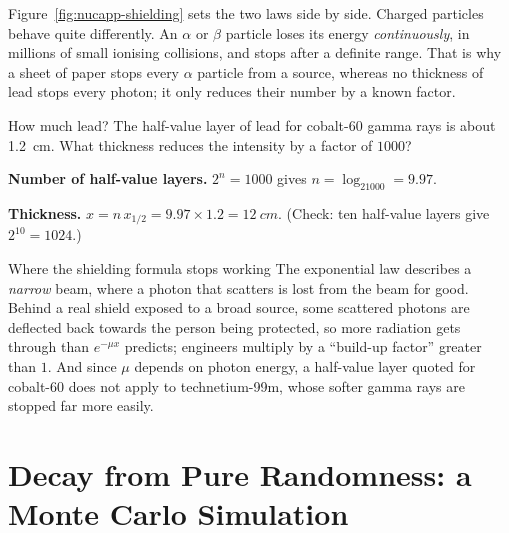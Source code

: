 Figure~\ref{fig:nucapp-shielding} sets the two laws side by side. Charged particles behave quite
differently. An $\alpha$ or $\beta$ particle loses its energy \emph{continuously}, in millions of small
ionising collisions, and stops after a definite range. That is why a sheet of paper stops every $\alpha$
particle from a source, whereas no thickness of lead stops every photon; it only reduces their number by a
known factor.

\begin{figure}[htbp]
\centering
{}
\end{figure}

\begin{exbox}{How much lead?}\label{ex:nucapp-lead}
The half-value layer of lead for cobalt-60 gamma rays is about \SI{1.2}{cm}. What thickness reduces the
intensity by a factor of $1000$?

 \textbf{Number of half-value layers.} $2^{n}=1000$ gives $n=\log_21000=9.97$.

 \textbf{Thickness.} $x=n\,x_{1/2}=9.97\times1.2=\SI{12}{cm}$. (Check: ten half-value layers give
$2^{10}=1024$.)
\end{exbox}

\begin{remarkbox}{Where the shielding formula stops working}
The exponential law describes a \emph{narrow} beam, where a photon that scatters is lost from the beam
for good. Behind a real shield exposed to a broad source, some scattered photons are deflected back
towards the person being protected, so more radiation gets through than $e^{-\mu x}$ predicts; engineers
multiply by a ``build-up factor'' greater than $1$. And since $\mu$ depends on photon energy, a half-value
layer quoted for cobalt-60 does not apply to technetium-99m, whose softer gamma rays are stopped far more
easily.
\end{remarkbox}

\section{Decay from Pure Randomness: a Monte Carlo Simulation}\label{sec:nucapp-montecarlo}

